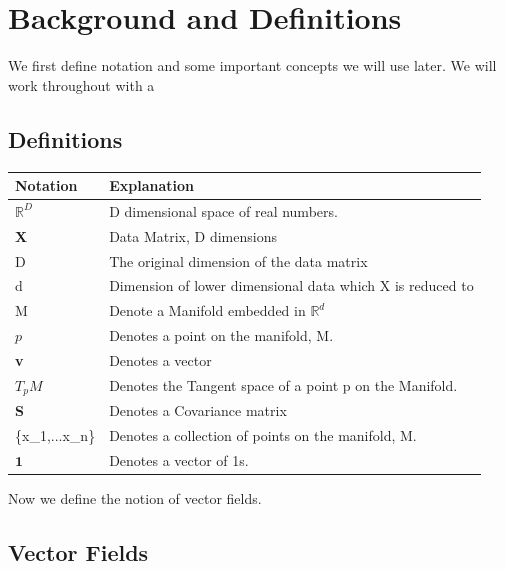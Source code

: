 \documentclass[12pt]{report}
\begin{document}
\section{Background and Definitions}

We first define notation and some important concepts we will use later.
We will work throughout with a 

\newpage

\subsection{Definitions}

\begin{table}[]
\begin{tabular}{|l|l|}
\hline
\textbf{Notation} & \textbf{Explanation}                                      \\ \hline
$\mathbb{R}^D$    & D dimensional space of real numbers.                      \\ \hline
\textbf{X}        & Data Matrix, D dimensions                                 \\ \hline
D                 & The original dimension of the data matrix                 \\ \hline
d                 & Dimension of lower dimensional data which X is reduced to \\ \hline
M                 & Denote a Manifold embedded in $\mathbb{R}^d$              \\ \hline
$p$               & Denotes a point on the manifold, M.                       \\ \hline
\textbf{v}        & Denotes a vector                                          \\ \hline
$T_pM$            & Denotes the Tangent space of a point p on the Manifold.   \\ \hline
\textbf{S}        & Denotes a Covariance matrix                               \\ \hline
\{x\_1,...x\_n\}  & Denotes a collection of points on the manifold, M.        \\ \hline
$\mathbf{1}$      & Denotes a vector of 1s.                                   \\ \hline
\end{tabular}
\end{table}

Now we define the notion of vector fields.

\subsection{Vector Fields}
\end{document}
